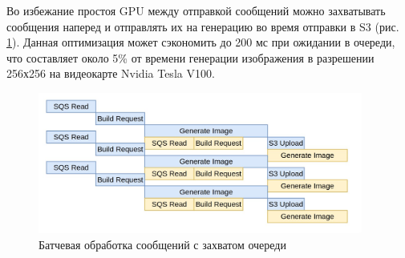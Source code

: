 Во избежание простоя GPU между отправкой сообщений можно захватывать сообщения наперед
и отправлять их на генерацию во время отправки в S3 (рис. \ref{fig:flame2}).
Данная оптимизация может сэкономить до 200 мс при ожидании в очереди, что составляет
около 5\% от времени генерации изображения в разрешении 256х256 на видеокарте Nvidia Tesla V100.

\begin{footnotesize}
\begin{figure}[H]
  \centering
  \includegraphics[width=0.95\textwidth]{img/flame2.jpg}
  \caption{Батчевая обработка сообщений с захватом очереди}
    \label{fig:flame2}
\end{figure}
\end{footnotesize}